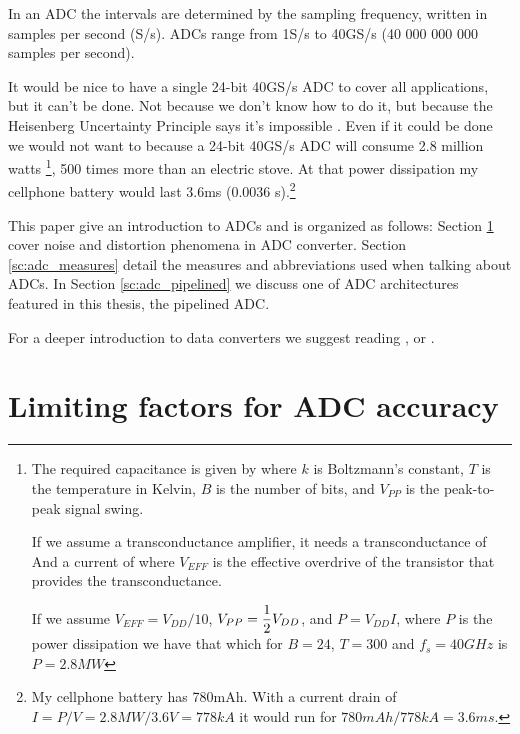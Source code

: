 In an ADC the intervals are
determined by the sampling frequency, written in samples per second
(S/s). ADCs range from 1S/s to 40GS/s (40 000 000 000
samples per second). 

It would be nice to have a single 24-bit 40GS/s ADC to cover all
applications, but it can't be done. Not because we don't know how
to do it, but because the Heisenberg Uncertainty Principle says it's
impossible \cite{walden99}. Even if it could be done we would not want
to because a 24-bit 40GS/s ADC will consume 2.8 million watts
\footnote{
The required capacitance is given by
where $k$ is Boltzmann's constant, $T$ is the temperature in Kelvin,
$B$ is the number of bits, and $V_{PP}$ is the peak-to-peak signal
swing.


 If we assume a
transconductance amplifier, it needs a transconductance of
And a current of 
where $V_{EFF}$ is the effective overdrive of the transistor that
provides the transconductance.

If we assume $V_{EFF} = V_{DD}/10$, $V_{PP} = \dfrac{1}{2} V_{DD}$, and $P =
V_{DD} I$, where $P$ is the power dissipation we have that
which for $B=24$, $T=300$ and $f_s=40GHz$ is $P=2.8MW$
}, 500 times more than an
electric stove. At that power dissipation my cellphone battery would
last 3.6ms (0.0036 s).\footnote{My cellphone battery has
  780mAh. With a current drain of $I= P/V = 2.8MW/3.6V = 778kA$ it
  would run for $780mAh/778kA = 3.6 ms$.}

This paper give an introduction to ADCs and is organized as follows:
Section \ref{sc:adc_limits} cover noise and distortion phenomena in
ADC converter. Section \ref{sc:adc_measures} detail the measures and
abbreviations used when talking about ADCs. In Section
\ref{sc:adc_pipelined} we discuss one of ADC architectures featured in
this thesis, the pipelined ADC.

For
a deeper introduction to data converters we suggest reading
\cite{johns}, or \cite{plassche}. 



\section{Limiting factors for ADC accuracy}\label{sc:adc_limits}

